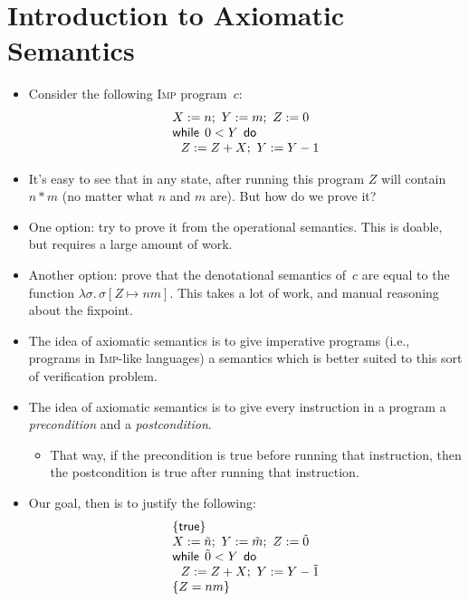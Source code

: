 \documentclass{lecturenotes}
\newcommand{\Imp}{\textsc{Imp}\xspace}
\newcommand{\itrue}{\textsf{true}}
\begin{document}
\section{Introduction to Axiomatic Semantics}
\label{sec:intr-axiom-semant}

\begin{itemize}
\item Consider the following \Imp program~$c$:
  $$
  \begin{array}{l}
    X := n;~Y := m;~Z := 0\\
    \textsf{while}\mkern8mu0 < Y\mkern8mu\textsf{do}\\
    ~~Z := Z + X;~Y := Y - 1
  \end{array}
  $$
\item It's easy to see that in any state, after running this program $Z$ will contain $n * m$ (no matter what $n$ and $m$ are).
  But how do we prove it?
\item One option: try to prove it from the operational semantics.
  This is doable, but requires a large amount of work.
\item Another option: prove that the denotational semantics of~$c$ are equal to the function $\lambda \sigma.\, \sigma[Z \mapsto nm]$.
  This takes a lot of work, and manual reasoning about the fixpoint.
\item The idea of axiomatic semantics is to give imperative programs (i.e., programs in \Imp-like languages) a semantics which is better suited to this sort of verification problem.
\item The idea of axiomatic semantics is to give every instruction in a program a \emph{precondition} and a \emph{postcondition}.
  \begin{itemize}
  \item That way, if the precondition is true before running that instruction, then the postcondition is true after running that instruction.
  \end{itemize}
\item Our goal, then is to justify the following:
  $$
  \begin{array}{l}
    \{ \itrue \}\\
    X := \tilde{n};~Y := \tilde{m};~Z := \tilde{0}\\
    \textsf{while}\mkern8mu\tilde{0} < Y\mkern8mu\textsf{do}\\
    ~~Z := Z + X;~Y := Y - \tilde{1}\\
    \{ Z = nm \}
  \end{array}
  $$
  \begin{itemize}

\end{itemize}
\end{itemize}
\end{document}
